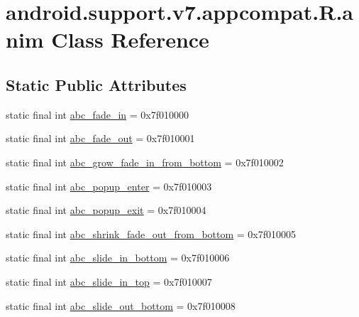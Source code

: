 \hypertarget{classandroid_1_1support_1_1v7_1_1appcompat_1_1_r_1_1anim}{}\section{android.\+support.\+v7.\+appcompat.\+R.\+anim Class Reference}
\label{classandroid_1_1support_1_1v7_1_1appcompat_1_1_r_1_1anim}
\subsection*{Static Public Attributes}
\begin{DoxyCompactItemize}
\item 
static final int \mbox{\hyperlink{classandroid_1_1support_1_1v7_1_1appcompat_1_1_r_1_1anim_a665e81e9b94944163fe09d845ed3acb4}{abc\+\_\+fade\+\_\+in}} = 0x7f010000
\item 
static final int \mbox{\hyperlink{classandroid_1_1support_1_1v7_1_1appcompat_1_1_r_1_1anim_a9ee34f536803896c9ff3565989bbbeef}{abc\+\_\+fade\+\_\+out}} = 0x7f010001
\item 
static final int \mbox{\hyperlink{classandroid_1_1support_1_1v7_1_1appcompat_1_1_r_1_1anim_a453e567186301fd6de044b87e3895137}{abc\+\_\+grow\+\_\+fade\+\_\+in\+\_\+from\+\_\+bottom}} = 0x7f010002
\item 
static final int \mbox{\hyperlink{classandroid_1_1support_1_1v7_1_1appcompat_1_1_r_1_1anim_a4ebe12e5d55910691a4c025423c8c5c6}{abc\+\_\+popup\+\_\+enter}} = 0x7f010003
\item 
static final int \mbox{\hyperlink{classandroid_1_1support_1_1v7_1_1appcompat_1_1_r_1_1anim_a663ac7c42efa1a4de1cd936b6d98d894}{abc\+\_\+popup\+\_\+exit}} = 0x7f010004
\item 
static final int \mbox{\hyperlink{classandroid_1_1support_1_1v7_1_1appcompat_1_1_r_1_1anim_a9bfbcebac78098ea68cf7a159c4405f7}{abc\+\_\+shrink\+\_\+fade\+\_\+out\+\_\+from\+\_\+bottom}} = 0x7f010005
\item 
static final int \mbox{\hyperlink{classandroid_1_1support_1_1v7_1_1appcompat_1_1_r_1_1anim_abb2d88595ab4324c44388605906fa733}{abc\+\_\+slide\+\_\+in\+\_\+bottom}} = 0x7f010006
\item 
static final int \mbox{\hyperlink{classandroid_1_1support_1_1v7_1_1appcompat_1_1_r_1_1anim_ac0aa69e88ce72f0047081d13502c4068}{abc\+\_\+slide\+\_\+in\+\_\+top}} = 0x7f010007
\item 
static final int \mbox{\hyperlink{classandroid_1_1support_1_1v7_1_1appcompat_1_1_r_1_1anim_a112797338f6fb204a8a1c71bad3e4367}{abc\+\_\+slide\+\_\+out\+\_\+bottom}} = 0x7f010008

\end{DoxyCompactItemize}
